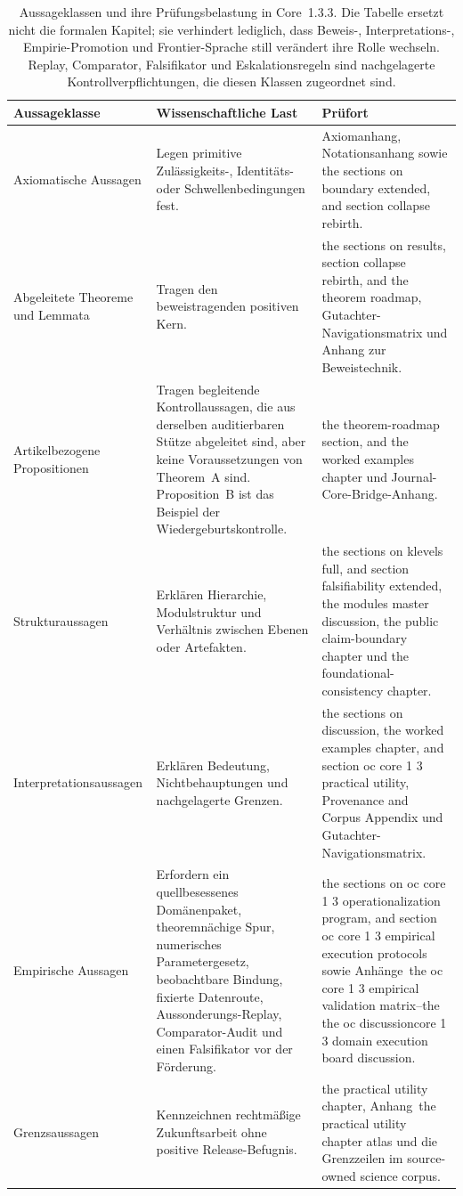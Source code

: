 \begin{table}[htbp]
\centering
\begingroup
\footnotesize
\RaggedRight
\setlength{\tabcolsep}{4pt}
\begin{tabular}{@{}L{0.21\textwidth}L{0.28\textwidth}L{0.39\textwidth}@{}}
\toprule
\textbf{Aussageklasse} & \textbf{Wissenschaftliche Last} & \textbf{Prüfort} \\
\midrule
Axiomatische Aussagen & Legen primitive Zulässigkeits-, Identitäts- oder Schwellenbedingungen fest. & Axiomanhang, Notationsanhang sowie the sections on boundary extended, and section collapse rebirth. \\
Abgeleitete Theoreme und Lemmata & Tragen den beweistragenden positiven Kern. & the sections on results, section collapse rebirth, and the theorem roadmap, Gutachter-Navigationsmatrix und Anhang zur Beweistechnik. \\
Artikelbezogene Propositionen & Tragen begleitende Kontrollaussagen, die aus derselben auditierbaren Stütze abgeleitet sind,
      aber keine Voraussetzungen von Theorem~A sind. Proposition~B ist das Beispiel der Wiedergeburtskontrolle. & the theorem-roadmap section, and the worked examples chapter und Journal-Core-Bridge-Anhang. \\
Strukturaussagen & Erklären Hierarchie, Modulstruktur und Verhältnis zwischen Ebenen oder Artefakten. & the sections on klevels full, and section falsifiability extended, the modules master discussion, the public claim-boundary chapter und the foundational-consistency chapter. \\
Interpretationsaussagen & Erklären Bedeutung, Nichtbehauptungen und nachgelagerte Grenzen. & the sections on discussion, the worked examples chapter, and section oc core 1 3 practical utility, Provenance and Corpus Appendix und Gutachter-Navigationsmatrix. \\
Empirische Aussagen & Erfordern ein quellbesessenes Domänenpaket, theoremnächige Spur, numerisches
      Parametergesetz, beobachtbare Bindung, fixierte Datenroute, Aussonderungs-Replay,
      Comparator-Audit und einen Falsifikator vor der Förderung. & the sections on oc core 1 3 operationalization program, and section oc core 1 3 empirical execution protocols sowie Anhänge~the oc core 1 3 empirical validation matrix--the the oc discussioncore 1 3 domain execution board discussion. \\
Grenzsaussagen & Kennzeichnen rechtmäßige Zukunftsarbeit ohne positive Release-Befugnis. & the practical utility chapter, Anhang~the practical utility chapter atlas und die Grenzzeilen im source-owned science corpus. \\
\bottomrule
\end{tabular}
\endgroup
\caption{Aussageklassen und ihre Prüfungsbelastung in Core~1.3.3. Die Tabelle ersetzt nicht die formalen Kapitel;
sie verhindert lediglich, dass Beweis-, Interpretations-, Empirie-Promotion und Frontier-Sprache still
verändert ihre Rolle wechseln. Replay, Comparator, Falsifikator und Eskalationsregeln sind nachgelagerte
Kontrollverpflichtungen, die diesen Klassen zugeordnet sind.}
\label{tab:oc13-statement-classes}
\end{table}

